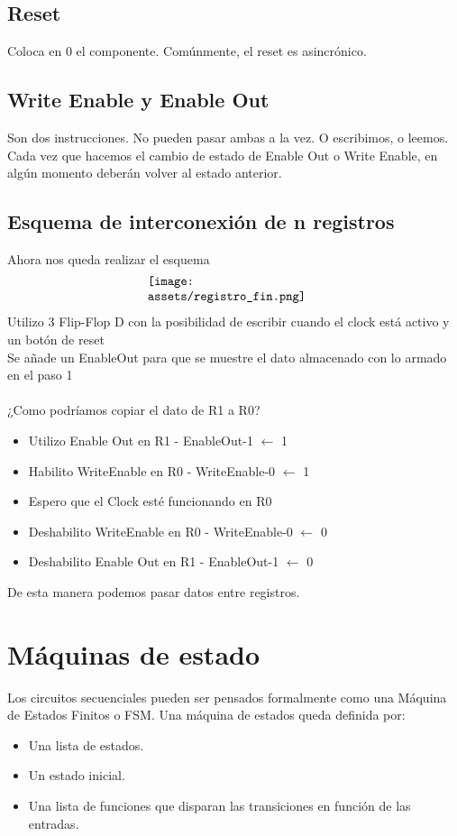\documentclass[10pt,a4paper]{article}
\begin{document}
\subsection*{Reset}
Coloca en 0 el componente. Comúnmente, el reset es asincrónico.
\subsection*{Write Enable y Enable Out}
Son dos instrucciones. No pueden pasar ambas a la vez. O escribimos, o leemos.
Cada vez que hacemos el cambio de estado de Enable Out o Write Enable, en algún momento deberán volver al estado anterior.

\subsection*{Esquema de interconexión de n registros}
Ahora nos queda realizar el esquema 
\[\begin{minipage}[b]{0.4\textwidth}
    \texttt{[image: assets/registro\_fin.png]}
    \label{fig:registro_fin}
\end{minipage}\]
Utilizo 3 Flip-Flop D con la posibilidad de escribir cuando el clock está activo y un botón de reset \\
Se añade un EnableOut para que se muestre el dato almacenado con lo armado en el paso 1 \\ \\
¿Como podríamos copiar el dato de R1 a R0? 
\begin{itemize}
    \item Utilizo Enable Out en R1 - EnableOut-1 \(\leftarrow\) 1
    \item Habilito WriteEnable en R0 - WriteEnable-0 \(\leftarrow\) 1
    \item Espero que el Clock esté funcionando en R0
    \item Deshabilito WriteEnable en R0 - WriteEnable-0 \(\leftarrow\) 0
    \item Deshabilito Enable Out en R1 - EnableOut-1 \(\leftarrow\) 0
\end{itemize}
De esta manera podemos pasar datos entre registros.

\section{Máquinas de estado}
Los circuitos secuenciales pueden ser pensados formalmente como una Máquina de Estados Finitos o FSM.
Una máquina de estados queda definida por: 
\begin{itemize}
    \item Una lista de estados.
    \item Un estado inicial.
    \item Una lista de funciones que disparan las transiciones en función de las entradas. 
\end{itemize}
\newpage
\end{document}
